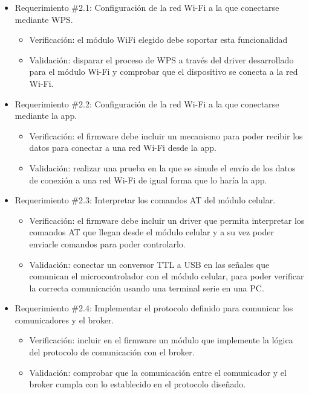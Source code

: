 \documentclass[
11pt, %
]{charter}
\begin{document}
\begin{itemize}
	\item Requerimiento \#2.1: Configuración de la red Wi-Fi a la que conectarse mediante WPS.
	\begin{itemize}
		\item Verificación: el módulo WiFi elegido debe soportar esta funcionalidad
		\item Validación: disparar el proceso de WPS a través del driver desarrollado para el
módulo Wi-Fi y comprobar que el dispositivo se conecta a la red Wi-Fi.
	\end{itemize}
			
	\item Requerimiento \#2.2: Configuración de la red Wi-Fi a la que conectarse mediante la app.
	\begin{itemize}
		\item Verificación: el firmware debe incluir un mecanismo para poder recibir los datos para conectar a una red Wi-Fi desde la app.
		\item Validación: realizar una prueba en la que se simule el envío de los datos de conexión a una red Wi-Fi de igual forma que lo haría la app.
	\end{itemize}
			
	\item Requerimiento \#2.3: Interpretar los comandos AT del módulo celular.
	\begin{itemize}
		\item Verificación: el firmware debe incluir un driver que permita interpretar los comandos AT que llegan desde el módulo celular y a su vez poder enviarle comandos para poder controlarlo.
		\item Validación: conectar un conversor TTL a USB en las señales que comunican el microcontrolador con el módulo celular, para poder verificar la correcta comunicación usando una terminal serie en una PC.
	\end{itemize}
			
	\item Requerimiento \#2.4: Implementar el protocolo definido para comunicar los comunicadores y el broker.
	\begin{itemize}
		\item Verificación: incluir en el firmware un módulo que implemente la lógica del protocolo de comunicación con el broker.
		\item Validación: comprobar que la comunicación entre el comunicador y el broker cumpla con lo establecido en el protocolo diseñado.
	\end{itemize}
			

\end{itemize}
\end{document}
